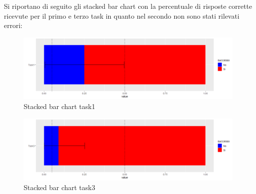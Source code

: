 \documentclass[12pt]{article}
\begin{document}
Si riportano di seguito gli stacked bar chart con la percentuale di risposte corrette ricevute per il primo e terzo task in quanto nel secondo non sono stati rilevati errori:
\begin{figure}[H]
    \centering
    \includegraphics[scale = 0.45]{img/task/Dash3_TaskDifferenza_ErrorBar.png}
    \caption{Stacked bar chart task1}
\end{figure}
\begin{figure}[H]
    \centering
    \includegraphics[scale = 0.45]{img/task/Dash3_TaskPercentuale_ErrorBar.png}
    \caption{Stacked bar chart task3}
\end{figure}
\end{document}
